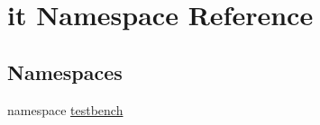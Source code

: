 \hypertarget{namespaceit}{\section{it Namespace Reference}
\label{d1/dc7/namespaceit}
}
\subsection*{Namespaces}
\begin{DoxyCompactItemize}
\item 
namespace \hyperlink{namespaceit_1_1testbench}{testbench}
\end{DoxyCompactItemize}
